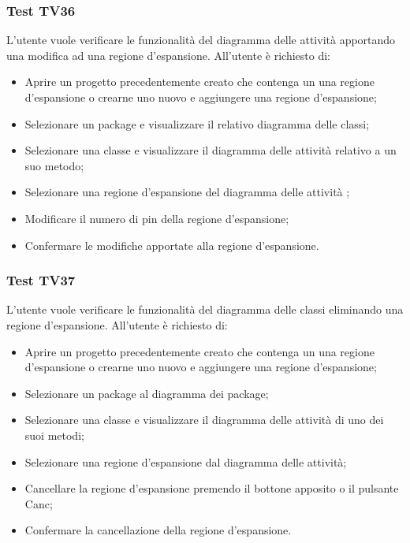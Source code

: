 \documentclass[../PianoDiQualifica.tex]{subfiles}
\begin{document}
	\subsubsection{Test TV36} 
	L'utente vuole verificare le funzionalità del diagramma delle attività apportando una modifica ad una regione d'espansione. 
	All'utente è richiesto di: 
	\begin{itemize} 
		\item Aprire un progetto precedentemente creato che contenga un una regione d'espansione o crearne uno nuovo e aggiungere una regione d'espansione;
		\item Selezionare un package e visualizzare il relativo diagramma delle classi; 
		\item Selezionare una classe e visualizzare il diagramma delle attività relativo a un suo metodo; 
		\item Selezionare una regione d'espansione del diagramma delle attività ;
		\item Modificare il numero di pin della regione d'espansione;%
		\item Confermare le modifiche apportate alla regione d'espansione. 
	\end{itemize} 
	
	
	\subsubsection{Test TV37} 
	L'utente vuole verificare le funzionalità del diagramma delle classi eliminando una regione d'espansione. 
	All'utente è richiesto di: 
	\begin{itemize} 
		\item Aprire un progetto precedentemente creato che contenga un una regione d'espansione o crearne uno nuovo e aggiungere una regione d'espansione;
		\item Selezionare un package al diagramma dei package; 
		\item Selezionare una classe e visualizzare il diagramma delle attività di uno dei suoi metodi; 
		\item Selezionare una regione d'espansione dal diagramma delle attività; 
		\item Cancellare la regione d'espansione premendo il bottone apposito o il pulsante Canc; 
		\item Confermare la cancellazione della regione d'espansione. 
	\end{itemize} 
	
	
	
\end{document}
